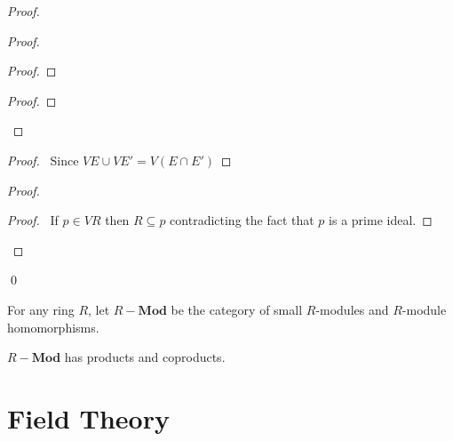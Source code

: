 \begin{proof}
\pf
{}
\begin{proof}
	\begin{proof}
	\end{proof}
	\begin{proof}
	\end{proof}
\end{proof}
\begin{proof}
	\pf\ Since $VE \cup VE' = V(E \cap E')$
\end{proof}
\begin{proof}
	\begin{proof}
		\pf\ If $p \in VR$ then $R \subseteq p$ contradicting the fact that $p$ is a prime ideal.
	\end{proof}
\end{proof}
\qed
\end{proof}

\begin{df}
For any ring $R$, let $R-\mathbf{Mod}$ be the category of small $R$-modules and $R$-module homomorphisms.
\end{df}

\begin{prop}
$R-\mathbf{Mod}$ has products and coproducts.
\end{prop}


\chapter{Field Theory}


